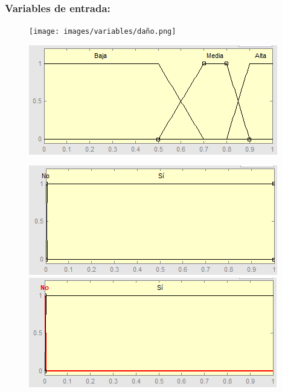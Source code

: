 \subsubsection{Variables de entrada:}
\begin{figure}[H]
	\centering
	\begin{minipage}{.5\textwidth}
		\centering
		\texttt{[image: images/variables/daño.png]}
	\end{minipage}%
	\begin{minipage}{.5\textwidth}
		\centering
		\includegraphics[scale=0.67]{images/variables/pa.png}
	\end{minipage}
\end{figure}

\begin{figure}[H]
	\centering
	\begin{minipage}{.5\textwidth}
		\centering
		\includegraphics[scale=0.67]{images/variables/es.png}
	\end{minipage}%
	\begin{minipage}{.5\textwidth}
		\centering
		\includegraphics[scale=0.67]{images/variables/ps.png}
	\end{minipage}
\end{figure}


